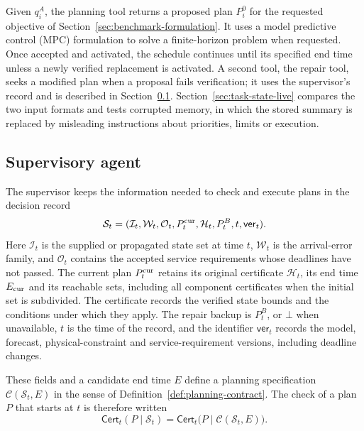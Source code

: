 \documentclass[final]{cas-sc}
\theoremstyle{definition}
\theoremstyle{plain}
\theoremstyle{definition}
\theoremstyle{plain}
\begin{document}
Given $q_i^{A}$, the planning tool returns a proposed plan $P_i^{0}$
for the requested objective of Section~\ref{sec:benchmark-formulation}. It uses
a model predictive control (MPC) formulation
\cite{geroliminis2013mpc} to solve a finite-horizon problem when
requested. Once accepted and activated, the schedule continues until
its specified end time unless a newly verified replacement is activated. A second tool, the repair tool, seeks a modified
plan when a proposal fails verification; it uses the supervisor's
record and is described in Section~\ref{sec:supervisory-agent}.
Section~\ref{sec:task-state-live} compares the two input formats and
tests corrupted memory, in which the stored summary is replaced by
misleading instructions about priorities, limits or execution.

\subsection{Supervisory agent}
\label{sec:supervisory-agent}

The supervisor keeps the information needed to check and execute
plans in the decision record
\[
\mathcal S_t=(\mathcal I_t,\mathcal W_t,\mathcal O_t,P_t^{\rm cur},
\mathcal H_t,P_t^{B},t,\mathsf{ver}_t).
\]
Here $\mathcal I_t$ is the supplied or propagated state set at time
$t$, $\mathcal W_t$ is the arrival-error family, and $\mathcal O_t$
contains the accepted service requirements whose deadlines have not
passed. The current plan $P_t^{\rm cur}$ retains its original
certificate $\mathcal H_t$, its end time $E_{\rm cur}$ and its reachable sets,
including all component certificates when the initial set is
subdivided. The certificate records the verified state bounds and the
conditions under which they apply. The repair backup is $P_t^{B}$, or
$\bot$ when unavailable, $t$ is the time of the record, and the
identifier $\mathsf{ver}_t$ records the model, forecast,
physical-constraint and service-requirement versions, including
deadline changes.

These fields and a candidate end time $E$ define a planning
specification $\mathcal C(\mathcal S_t,E)$ in the sense of
Definition~\ref{def:planning-contract}. The check of a plan $P$
that starts at $t$ is therefore written
\[
\mathsf{Cert}_t(P\mid\mathcal S_t)
=\mathsf{Cert}_t\big(P\mid\mathcal C(\mathcal S_t,E)\big).
\]
\end{document}
